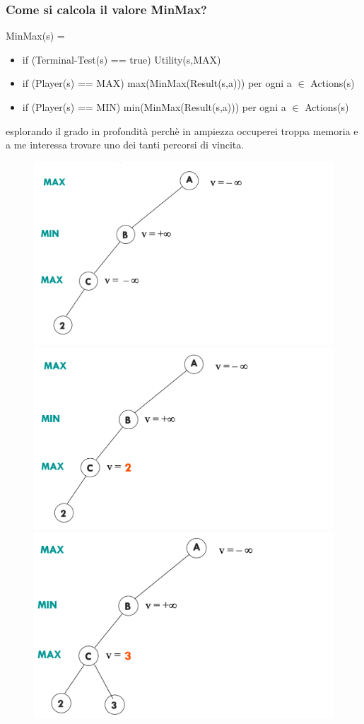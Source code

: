 \documentclass{article}
\begin{document}
\subsubsection{Come si calcola il valore MinMax?}
MinMax(s) =
\begin{itemize}
    \item if (Terminal-Test(s) == true) Utility(s,MAX)
    \item if (Player(s) == MAX) max(MinMax(Result(s,a))) per ogni a $\in$ Actions(s)
    \item if (Player(s) == MIN) min(MinMax(Result(s,a))) per ogni a $\in$ Actions(s)
\end{itemize}
esplorando il grado in profondità perchè in ampiezza occuperei troppa memoria e a me interessa trovare uno dei tanti percorsi di vincita.
\newpage
\begin{figure}[h!]
\centering
\includegraphics[scale=0.15]{Images/minmaxaction1.png}
\includegraphics[scale=0.15]{Images/minmaxaction2.png}
\includegraphics[scale=0.15]{Images/minmaxaction3.png}

\end{figure}
\end{document}
